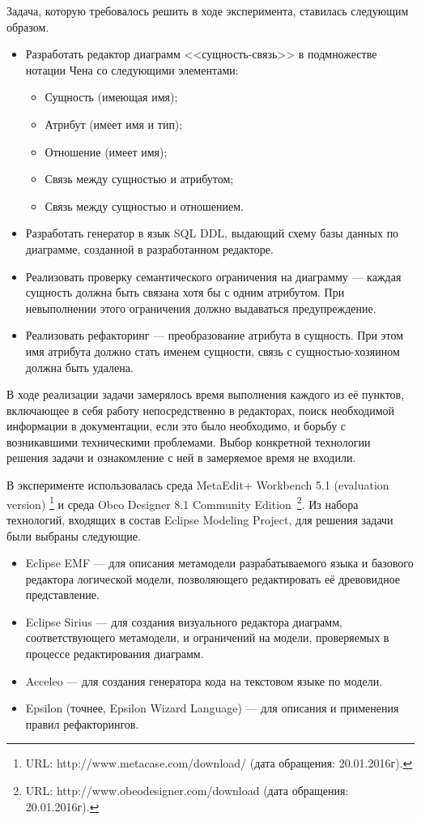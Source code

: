 Задача, которую требовалось решить в ходе эксперимента, ставилась следующим образом.
\begin{itemize}
	\item Разработать редактор диаграмм <<сущность-связь>> в подмножестве нотации Чена со
		следующими элементами:
		\begin{itemize}
			\item Сущность (имеющая имя);
			\item Атрибут (имеет имя и тип);
			\item Отношение (имеет имя);
			\item Связь между сущностью и атрибутом;
			\item Связь между сущностью и отношением.
		\end{itemize}
	\item Разработать генератор в язык \ac{SQL} \ac{DDL}, выдающий схему базы данных по 
		диаграмме, созданной в разработанном редакторе.
	\item Реализовать проверку семантического ограничения на диаграмму --- каждая сущность
		должна быть связана хотя бы с одним атрибутом. При невыполнении этого ограничения должно 
		выдаваться предупреждение.
	\item Реализовать рефакторинг --- преобразование атрибута в сущность. При этом имя атрибута 
		должно стать именем сущности, связь с сущностью-хозяином должна быть удалена.
\end{itemize}

В ходе реализации задачи замерялось время выполнения каждого из её пунктов, включающее
в себя работу непосредственно в редакторах, поиск необходимой информации в документации, если это было необходимо, 
и борьбу с возникавшими техническими проблемами. Выбор конкретной технологии решения задачи 
и ознакомление с ней в замеряемое время не входили.

В эксперименте использовалась среда MetaEdit+ Workbench 5.1 (evaluation version)
\footnote{URL: http://www.metacase.com/download/ (дата обращения: 20.01.2016г).}
и среда Obeo Designer 8.1 Community Edition~\footnote{URL: http://www.obeodesigner.com/download (дата обращения: 20.01.2016г).}.
Из набора технологий, входящих в состав Eclipse Modeling Project, для решения задачи были выбраны
следующие.
\begin{itemize}
	\item Eclipse EMF --- для описания метамодели разрабатываемого языка и базового редактора
		логической модели, позволяющего редактировать её древовидное представление.
	\item Eclipse Sirius --- для создания визуального редактора диаграмм, соответствующего
		метамодели, и ограничений на модели, проверяемых в процессе редактирования диаграмм.
	\item Acceleo --- для создания генератора кода на текстовом языке по модели.
	\item Epsilon (точнее, Epsilon Wizard Language) --- для описания и применения правил рефакторингов.
\end{itemize}


